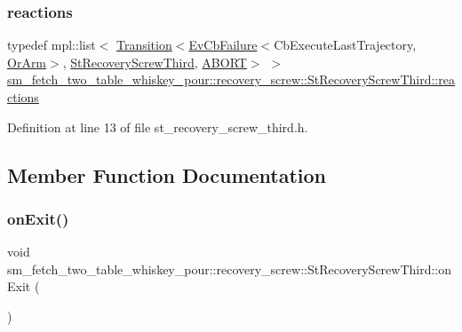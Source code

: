 \subsubsection{\texorpdfstring{reactions}{reactions}}
{\footnotesize\ttfamily typedef mpl\+::list$<$ \hyperlink{classsmacc_1_1Transition}{Transition}$<$\hyperlink{structsmacc_1_1EvCbFailure}{Ev\+Cb\+Failure}$<$Cb\+Execute\+Last\+Trajectory, \hyperlink{classsm__fetch__two__table__whiskey__pour_1_1OrArm}{Or\+Arm}$>$, \hyperlink{structsm__fetch__two__table__whiskey__pour_1_1recovery__screw_1_1StRecoveryScrewThird}{St\+Recovery\+Screw\+Third}, \hyperlink{structsmacc_1_1default__transition__tags_1_1ABORT}{A\+B\+O\+RT}$>$ $>$ \hyperlink{structsm__fetch__two__table__whiskey__pour_1_1recovery__screw_1_1StRecoveryScrewThird_a0469d0ce4b3b80dacb97538408dfcaf9}{sm\+\_\+fetch\+\_\+two\+\_\+table\+\_\+whiskey\+\_\+pour\+::recovery\+\_\+screw\+::\+St\+Recovery\+Screw\+Third\+::reactions}}



Definition at line 13 of file st\+\_\+recovery\+\_\+screw\+\_\+third.\+h.



\subsection{Member Function Documentation}
\mbox{\label{structsm__fetch__two__table__whiskey__pour_1_1recovery__screw_1_1StRecoveryScrewThird_ab36288c9baed7e7751a4cd44e0e421a1}} 
\subsubsection{\texorpdfstring{on\+Exit()}{onExit()}}
{\footnotesize\ttfamily void sm\+\_\+fetch\+\_\+two\+\_\+table\+\_\+whiskey\+\_\+pour\+::recovery\+\_\+screw\+::\+St\+Recovery\+Screw\+Third\+::on\+Exit (\begin{DoxyParamCaption}{ }\end{DoxyParamCaption})\hspace{0.3cm}{\ttfamily [inline]}}



